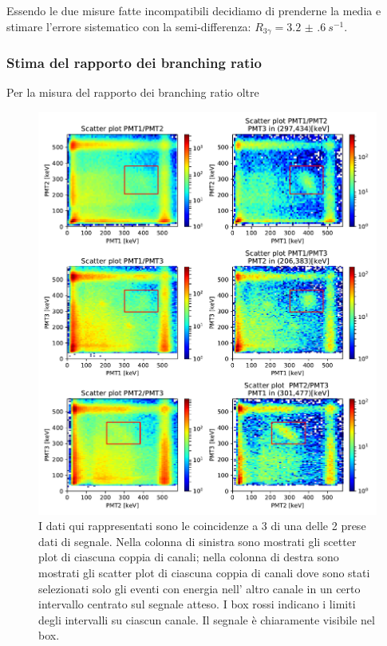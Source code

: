 Essendo le due misure fatte incompatibili decidiamo di prenderne la media e stimare l'errore sistematico con la semi-differenza: $R_{3\gamma} = \SI{3.2(6)}{s^{-1}}$.

\subsubsection{Stima del rapporto dei branching ratio}
Per la misura del rapporto dei branching ratio oltre 


 \begin{figure}[h]
	\hspace{-4em}
	\includegraphics[width=44em]{immagini/3gamma_signal}
	\caption{\label{fig:3gamma_signal} I dati qui rappresentati sono le coincidenze a 3 di una delle 2 prese dati di segnale. Nella colonna di sinistra sono mostrati gli scetter plot di ciascuna coppia di canali; nella colonna di destra sono mostrati gli scatter plot di ciascuna coppia di canali dove sono stati selezionati solo gli eventi con energia nell' altro canale in un certo intervallo centrato sul segnale atteso. I box rossi indicano i limiti degli intervalli su ciascun canale. Il segnale è chiaramente visibile nel box.}
\end{figure}

